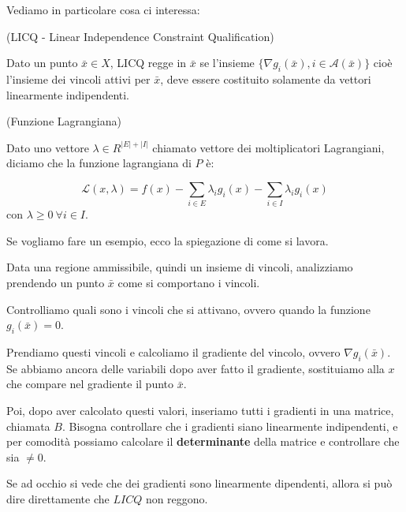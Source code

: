 Vediamo in particolare cosa ci interessa:

\begin{definition}
    (LICQ - Linear Independence Constraint Qualification)

    Dato un punto $\bar{x} \in X$, LICQ regge in $\bar{x}$ se l'insieme $\{\nabla g_i(\bar{x}), i \in \mathcal{A}(\bar{x})\}$ 
    cioè l'insieme dei vincoli attivi per $\bar{x}$, deve essere costituito solamente da vettori linearmente indipendenti.
\end{definition}

\begin{definition}
    (Funzione Lagrangiana)

    Dato uno vettore $\lambda \in R^{|E|+|I|}$ chiamato vettore dei moltiplicatori Lagrangiani, diciamo che la funzione lagrangiana di $P$ è:

    $$
    \mathcal{L}(x,\lambda) = f(x) - \sum_{i \in E} \lambda_i g_i(x) - \sum_{i \in I} \lambda_i g_i(x)   
    $$
    con $\lambda \geq 0 \ \forall i \in I$. 
\end{definition}

Se vogliamo fare un esempio, ecco la spiegazione di come si lavora.

Data una regione ammissibile, quindi un insieme di vincoli, analizziamo prendendo un punto $\bar{x}$
come si comportano i vincoli.

Controlliamo quali sono i vincoli che si attivano, ovvero quando la funzione $g_i(\bar{x}) = 0$.

Prendiamo questi vincoli e calcoliamo il gradiente del vincolo, ovvero $\nabla g_i(\bar{x})$.
Se abbiamo ancora delle variabili dopo aver fatto il gradiente, sostituiamo alla $x$ che 
compare nel gradiente il punto $\bar{x}$.

Poi, dopo aver calcolato questi valori, inseriamo tutti i gradienti in una matrice, chiamata $B$. 
Bisogna controllare che i gradienti siano linearmente indipendenti, e per comodità
possiamo calcolare il \textbf{determinante} della matrice e controllare che sia $\neq 0$.

Se ad occhio si vede che dei gradienti sono linearmente dipendenti, allora si può dire 
direttamente che $LICQ$ non reggono.